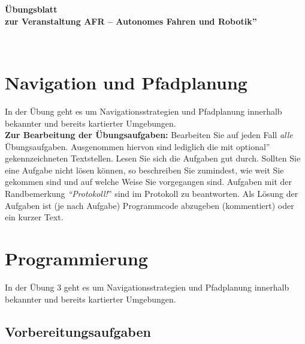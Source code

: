 \documentclass[ti,nofooter]{own-haw-page}
\begin{document}
\date{08.~November~2022}


\setcounter{section}{2} %
\setcounter{dummymcpdsv}{\value{section}}
\addtocounter{dummymcpdsv}{1}


\begin{page}

\begin{Large}
{\centering \bfseries \"{U}bungsblatt   \\ zur Veranstaltung  
\glqq AFR -- Autonomes Fahren und Robotik''\\}
\end{Large}
~\\[-0.5cm]

\section{Navigation und Pfadplanung}

In der \"{U}bung  geht es um Navigationsstrategien und Pfadplanung innerhalb bekannter und bereits kartierter Umgebungen. \\


\textbf{Zur Bearbeitung der \"{U}bungsaufgaben:} Bearbeiten Sie auf jeden Fall
\textit{alle} \"{U}bungsaufgaben. Ausgenommen hiervon sind lediglich die mit \glqq
optional'' gekennzeichneten Textstellen. Lesen Sie sich die Aufgaben gut durch.
Sollten Sie eine Aufgabe nicht l\"{o}sen k\"{o}nnen, so beschreiben Sie
zumindest, wie weit Sie gekommen sind und auf welche Weise Sie vorgegangen sind.
%
Aufgaben mit der Randbemerkung \textit{``Protokoll!}'' sind 
im Protokoll zu beantworten.
Als L\"{o}sung der Aufgaben ist %
(je nach Aufgabe)
Programmcode abzugeben
(kommentiert) oder ein kurzer Text.


\section{Programmierung}

In der \"{U}bung 3 geht es um Navigationsstrategien und Pfadplanung innerhalb bekannter und bereits kartierter Umgebungen.

\subsection{Vorbereitungsaufgaben}


\end{page}
\end{document}
